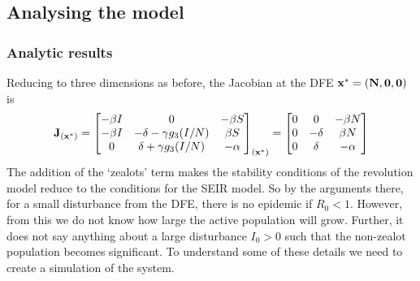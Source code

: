 \subsection{Analysing the model}
\subsubsection{Analytic results}
Reducing to three dimensions as before, the Jacobian at the DFE
$\bf{x}^*=(N,0,0)$ is\\
\[
\bf{J}_{(\bf{x}^*)}
={\begin{bmatrix}
	{-\beta I} &
	{0} &
	{-\beta S} \cr 
	{-\beta I} & 
	{-\delta-\gamma g_3(I/N)} & 
	{\beta S} \cr 
	{0} & 
	{\delta+\gamma g_3(I/N)} & 
	{-\alpha}
	\end{bmatrix}}
_{(\bf{x}^*)}
={\begin{bmatrix}
	{0} &
	{0} &
	{-\beta N} \cr 
	{0} & 
	{-\delta} & 
	{\beta N} \cr 
	{0} & 
	{\delta} & 
	{-\alpha}
	\end{bmatrix}}
\]
The addition of the `zealots' term makes the stability conditions of the revolution model reduce  to the conditions for the SEIR model. So by the arguments there, for a small disturbance from the DFE, there is no epidemic if $R_0<1$. However, from this we do not know how large the active population will grow. Further, it does not say anything about a large disturbance $I_0>0$ such that the non-zealot population becomes significant. To understand some of these details we need to create a simulation of the system.

